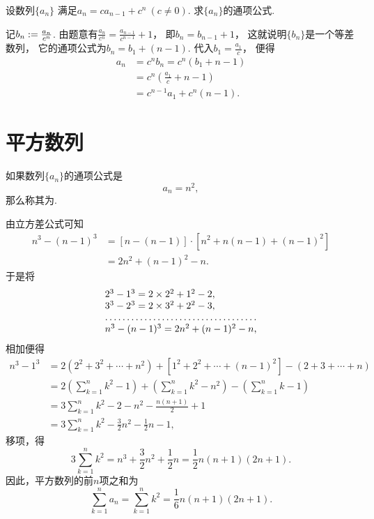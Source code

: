 \begin{example}
设数列\(\{a_n\}\)
满足\(a_n = c a_{n-1} + c^n\ (c\neq0)\).
求\(\{a_n\}\)的通项公式.
\begin{solution}
记\(b_n := \frac{a_n}{c^n}\).
由题意有\(
	\frac{a_n}{c^n} = \frac{a_{n-1}}{c^{n-1}} + 1
\)，
即\(b_n = b_{n-1} + 1\)，
这就说明\(\{b_n\}\)是一个等差数列，
它的通项公式为\(b_n = b_1 + (n-1)\).
代入\(b_1 = \frac{a_1}{c}\)，
便得\begin{align*}
	a_n &= c^n b_n
	= c^n (b_1 + n - 1) \\
	&= c^n \left( \frac{a_1}{c} + n - 1 \right) \\
	&= c^{n-1} a_1 + c^n (n - 1).
\end{align*}
\end{solution}
\end{example}

\section{平方数列}
如果数列\(\{a_n\}\)的通项公式是\begin{equation*}
a_n = n^2,
\end{equation*}那么称其为.

由立方差公式可知
\begin{equation*}\begin{aligned}
n^3 - (n-1)^3
&= [n - (n-1)] \cdot [n^2 + n(n-1) + (n-1)^2] \\
&= 2n^2 + (n-1)^2 - n.
\end{aligned}\end{equation*}于是将\begin{equation*}
\begin{array}{l}
2^3 - 1^3 = 2\times2^2+1^2-2, \\
3^3 - 2^3 = 2\times3^2+2^2-3, \\
\hdotsfor{1} \\
n^3 - (n-1)^3 = 2n^2 + (n-1)^2 - n,
\end{array}
\end{equation*}相加便得\begin{equation*}\begin{aligned}
n^3 - 1^3
&= 2(2^2+3^2+\dotsb+n^2) + [1^2+2^2+\dotsb+(n-1)^2] - (2+3+\dotsb+n) \\
&= 2\left(\sum_{k=1}^n k^2 - 1\right)
    + \left(\sum_{k=1}^n k^2 - n^2\right)
    - \left(\sum_{k=1}^n k - 1\right) \\
&= 3\sum_{k=1}^n k^2 - 2 - n^2 - \frac{n(n+1)}{2} + 1 \\
&= 3\sum_{k=1}^n k^2 - \frac{3}{2} n^2 - \frac{1}{2} n - 1,
\end{aligned}\end{equation*}
移项，得\begin{equation*}
3 \sum_{k=1}^n k^2
= n^3 + \frac{3}{2} n^2 + \frac{1}{2} n
= \frac{1}{2} n (n+1) (2n+1).
\end{equation*}
因此，平方数列的前\(n\)项之和为
\begin{equation}
	\sum_{k=1}^n a_n
	= \sum_{k=1}^n k^2
	= \frac{1}{6} n(n+1)(2n+1).
\end{equation}

